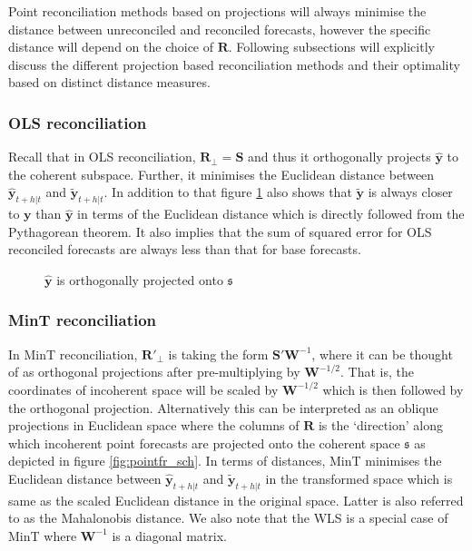 \documentclass[12pt]{article}
\theoremstyle{definition}
\begin{document}
	Point reconciliation methods based on projections will always minimise the distance between unreconciled and reconciled forecasts, however the specific distance will depend on the choice of $\bm{R}$. Following subsections will explicitly discuss the different projection based reconciliation methods and their optimality based on distinct distance measures. 
	
	\subsubsection{OLS reconciliation}
	
	Recall that in OLS reconciliation, $\bm{R}_\perp=\bm{S}$ and thus it orthogonally projects $\hat{\bm{y}}$ to the coherent subspace. Further, it minimises the Euclidean distance between $\hat{\bm{y}}_{t+h|t}$ and $\tilde{\bm{y}}_{t+h|t}$. In addition to that figure \ref{fig:Schematic_OLSRecon} also shows that $\tilde{\bm{y}}$ is always closer to $\bm{y}$ than $\hat{\bm{y}}$ in terms of the Euclidean distance which is directly followed from the Pythagorean theorem. It also implies that the sum of squared error for OLS reconciled forecasts are always less than that for base forecasts.    
	
			
	\begin{figure}[t!]
		\centering
		\vspace{-0.9cm}
		\tiny
		\resizebox{\linewidth}{!}{
			
		}
		\caption{$\hat{\bm{y}}$ is orthogonally projected onto $\mathfrak{s}$ }\label{fig:Schematic_OLSRecon}
	\end{figure}
	
	\subsubsection{MinT reconciliation}
	
	In MinT reconciliation, $\bm{R}'_\perp$ is taking the form $\bm{S}'{\bm{W}}^{-1}$, where it can be thought of as orthogonal projections after pre-multiplying by ${\bm{W}^{-1/2}}$. That is, the coordinates of incoherent space will be scaled by $\bm{W}^{-1/2}$ which is then followed by the orthogonal projection. Alternatively this can be interpreted as an oblique projections in Euclidean space where the columns of $\bm{R}$ is the `direction' along which incoherent point forecasts are projected onto the coherent space $\mathfrak{s}$ as depicted in figure \ref{fig:pointfr_sch}. In terms of distances, MinT minimises the Euclidean distance between $\hat{\bm{y}}_{t+h|t}$ and $\tilde{\bm{y}}_{t+h|t}$ in the transformed space which is same as the scaled Euclidean distance in the original space. Latter is also referred to as the Mahalonobis distance. We also note that the WLS is a special case of MinT where $\bm{W}^{-1}$ is a diagonal matrix. 
	
\end{document}
